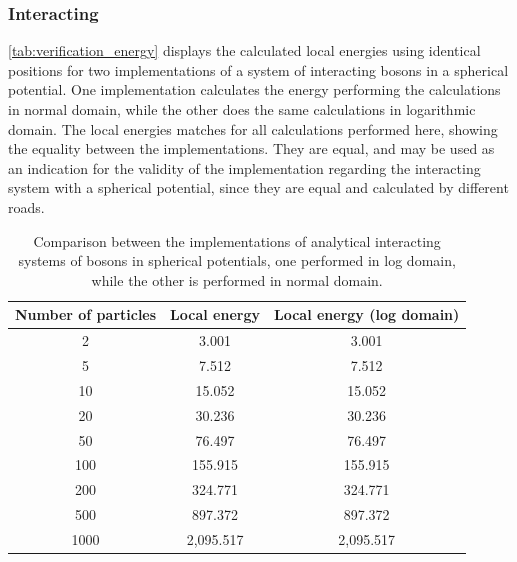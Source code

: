 \subsubsection{Interacting}
\autoref{tab:verification_energy} displays the calculated local energies using identical positions for two implementations of a system of interacting bosons in a spherical potential. One implementation calculates the energy performing the calculations in normal domain, while the other does the same calculations in logarithmic domain. The local energies matches for all calculations performed here, showing the equality between the implementations. They are equal, and may be used as an indication for the validity of the implementation regarding the interacting system with a spherical potential, since they are equal and calculated by different roads. 
\begin{table}[H]
    \centering
\begin{tabular}{c|c|c}
\hline \hline
 Number of particles &  Local energy &  Local energy (log domain) \\
\hline \hline
                   2 &         3.001 &                    3.001 \\
                   5 &         7.512 &                    7.512 \\
                  10 &        15.052 &                   15.052 \\
                  20 &        30.236 &                   30.236 \\
                  50 &        76.497 &                   76.497 \\
                 100 &       155.915 &                  155.915 \\
                 200 &       324.771 &                  324.771 \\
                 500 &       897.372 &                  897.372 \\
                1000 &     2,095.517 &                2,095.517 \\
\hline \hline
\end{tabular}
    \caption{Comparison between the implementations of analytical interacting systems of bosons in spherical potentials, one performed in log domain, while the other is performed in normal domain.}
    \label{tab:verification_energy}
\end{table} 


